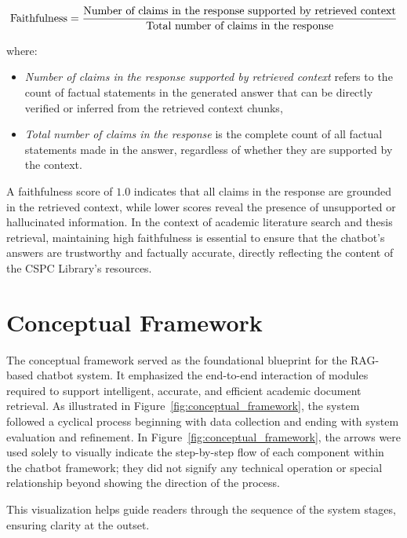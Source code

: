 \begin{refsection}
\begin{equation}
\centering
\text{Faithfulness} = \frac{\text{Number of claims in the response supported by retrieved context}}{\text{Total number of claims in the response}}
\end{equation}

where:
\begin{itemize}
\item \textit{Number of claims in the response supported by retrieved context} refers to the count of factual statements in the generated answer that can be directly verified or inferred from the retrieved context chunks,
\item \textit{Total number of claims in the response} is the complete count of all factual statements made in the answer, regardless of whether they are supported by the context.
\end{itemize}

A faithfulness score of $1.0$ indicates that all claims in the response are grounded in the retrieved context, while lower scores reveal the presence of unsupported or hallucinated information. In the context of academic literature search and thesis retrieval, maintaining high faithfulness is essential to ensure that the chatbot's answers are trustworthy and factually accurate, directly reflecting the content of the CSPC Library's resources.


\section{Conceptual Framework}

The conceptual framework served as the foundational blueprint for the RAG-based chatbot system. It emphasized the end-to-end interaction of modules required to support intelligent, accurate, and efficient academic document retrieval. As illustrated in Figure~\ref{fig:conceptual_framework}, the system followed a cyclical process beginning with data collection and ending with system evaluation and refinement.
In Figure~\ref{fig:conceptual_framework}, the arrows were used solely to visually indicate the step-by-step flow of each component within the chatbot framework; they did not signify any technical operation or special relationship beyond showing the direction of the process. 

This visualization helps guide readers through the sequence of the system stages, ensuring clarity at the outset.


\end{refsection}
